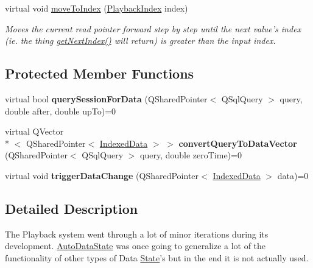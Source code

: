 \begin{DoxyCompactItemize}
virtual void \hyperlink{class_picto_1_1_auto_data_state_ab1f020f805466b43eddebf93a6e95b3e}{move\-To\-Index} (\hyperlink{struct_picto_1_1_playback_index}{Playback\-Index} index)
\begin{DoxyCompactList}\small\item\em Moves the current read pointer forward step by step until the next value's index (ie. the thing \hyperlink{class_picto_1_1_auto_data_state_a5b6a6116c29d073fc0b7c990d8d680ab}{get\-Next\-Index()} will return) is greater than the input index. \end{DoxyCompactList}\end{DoxyCompactItemize}
\subsection*{Protected Member Functions}
\begin{DoxyCompactItemize}
\item 
\hypertarget{class_picto_1_1_auto_data_state_a758b8c2c78fe32ddf899635447b92908}{virtual bool {\bfseries query\-Session\-For\-Data} (Q\-Shared\-Pointer$<$ Q\-Sql\-Query $>$ query, double after, double up\-To)=0}\label{class_picto_1_1_auto_data_state_a758b8c2c78fe32ddf899635447b92908}

\item 
\hypertarget{class_picto_1_1_auto_data_state_a5a6f6d785b97eedbdd4f4bb8020d6c90}{virtual Q\-Vector\\*
$<$ Q\-Shared\-Pointer$<$ \hyperlink{struct_picto_1_1_indexed_data}{Indexed\-Data} $>$ $>$ {\bfseries convert\-Query\-To\-Data\-Vector} (Q\-Shared\-Pointer$<$ Q\-Sql\-Query $>$ query, double zero\-Time)=0}\label{class_picto_1_1_auto_data_state_a5a6f6d785b97eedbdd4f4bb8020d6c90}

\item 
\hypertarget{class_picto_1_1_auto_data_state_ada9af706fb8367bf46259421d8473f0c}{virtual void {\bfseries trigger\-Data\-Change} (Q\-Shared\-Pointer$<$ \hyperlink{struct_picto_1_1_indexed_data}{Indexed\-Data} $>$ data)=0}\label{class_picto_1_1_auto_data_state_ada9af706fb8367bf46259421d8473f0c}

\end{DoxyCompactItemize}


\subsection{Detailed Description}
The Playback system went through a lot of minor iterations during its development. \hyperlink{class_picto_1_1_auto_data_state}{Auto\-Data\-State} was once going to generalize a lot of the functionality of other types of Data \hyperlink{class_picto_1_1_state}{State}'s but in the end it is not actually used. 

